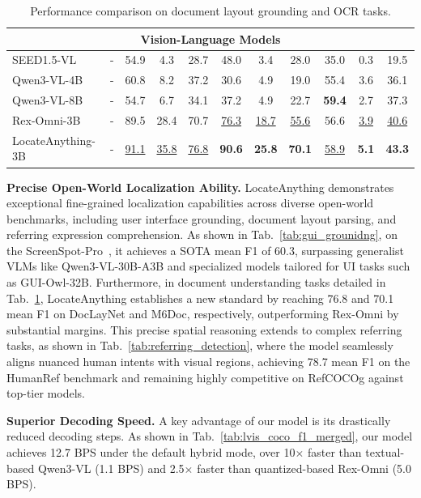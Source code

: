 \documentclass{llmxive}
\begin{document}
\begin{table}[t]
{\begin{tabular}{l|c|ccc|ccc|ccc}
\multicolumn{11}{c}{{Vision-Language Models}} \\
\midrule
SEED1.5-VL~\citep{guo2025seed15vltechnicalreport} & -
& 54.9 & 4.3 & 28.7
& 48.0 & 3.4 & 28.0
& 35.0 & 0.3 & 19.5 \\
Qwen3-VL-4B~\citep{bai2025qwen3vltechnicalreport} & -
& 60.8 & 8.2 & 37.2
& 30.6 & 4.9 & 19.0
& 55.4 & 3.6 & 36.1 \\
Qwen3-VL-8B~\citep{bai2025qwen3vltechnicalreport} & -
& 54.7 & 6.7 & 34.1
& 37.2 & 4.9 & 22.7
& \textbf{59.4} & 2.7 & 37.3 \\
Rex-Omni-3B~\citep{jiang2025rexomni} & -
& 89.5 & 28.4 & 70.7
& \underline{76.3} & \underline{18.7} & \underline{55.6}
& 56.6 & \underline{3.9} & \underline{40.6} \\
\rowcolor{lightblue!10}
LocateAnything-3B & -
& \underline{91.1} & \underline{35.8} & \underline{76.8}
& \textbf{90.6} & \textbf{25.8} & \textbf{70.1}
& \underline{58.9} & \textbf{5.1} & \textbf{43.3} \\
\bottomrule
        \end{tabular}
    }
    \label{tab:layout_ocr_merged}
\caption{Performance comparison on document layout grounding and OCR tasks.}
\end{table}

\vspace{+1mm}
\noindent\textbf{Precise Open-World Localization Ability.}
LocateAnything demonstrates exceptional fine-grained localization capabilities across diverse open-world benchmarks, including user interface grounding, document layout parsing, and referring expression comprehension. As shown in Tab.~\ref{tab:gui_grounidng}, on the ScreenSpot-Pro~\citep{li2025screenspot}, it achieves a SOTA mean F1 of 60.3, surpassing generalist VLMs like Qwen3-VL-30B-A3B and specialized models tailored for UI tasks such as GUI-Owl-32B. Furthermore, in document understanding tasks detailed in Tab.~\ref{tab:layout_ocr_merged}, LocateAnything establishes a new standard by reaching 76.8 and 70.1 mean F1 on DocLayNet and M6Doc, respectively, outperforming Rex-Omni by substantial margins. This precise spatial reasoning extends to complex referring tasks, as shown in Tab.~\ref{tab:referring_detection}, where the model seamlessly aligns nuanced human intents with visual regions, achieving 78.7 mean F1 on the HumanRef benchmark and remaining highly competitive on RefCOCOg against top-tier models.

\vspace{+1mm}
\noindent\textbf{Superior Decoding Speed.}
A key advantage of our model is its drastically reduced decoding steps. As shown in Tab.~\ref{tab:lvis_coco_f1_merged}, our model achieves 12.7 BPS under the default hybrid mode, over 10$\times$ faster than textual-based Qwen3-VL (1.1 BPS) and 2.5$\times$ faster than quantized-based Rex-Omni (5.0 BPS).
\end{document}
